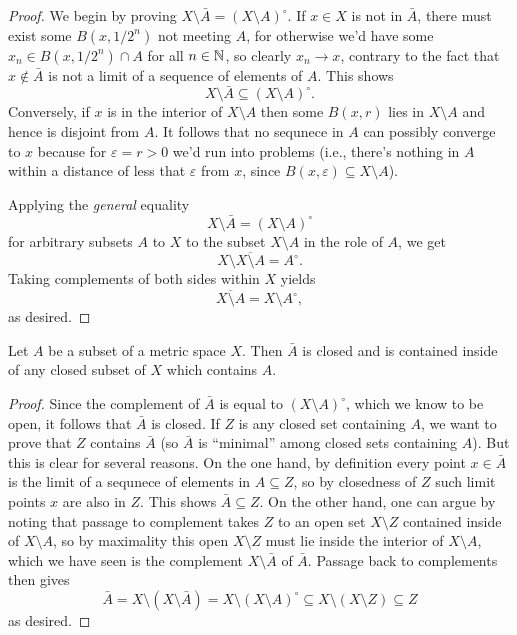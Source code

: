 \begin{proof}
  We begin by proving \(X\setminus\bar A=(X\setminus A)^\circ\). If \(x\in
  X\) is not in \(\bar A\), there must exist some \(B(x,1/2^n)\) not
  meeting \(A\), for otherwise we'd have some \(x_n\in B(x,1/2^n)\cap A\)
  for all \(n\in\mathbb{N}\), so clearly \(x_n\to x\), contrary to the fact that
  \(x\notin\bar A\) is not a limit of a sequence of elements of \(A\). This
  shows
  \[
    X\setminus\bar A\subseteq(X\setminus A)^\circ.
  \]
  Conversely, if \(x\) is in the interior of \(X\setminus A\) then some
  \(B(x,r)\) lies in \(X\setminus A\) and hence is disjoint from \(A\). It
  follows that no sequnece in \(A\) can possibly converge to \(x\) because
  for \(\varepsilon=r>0\) we'd run into problems (i.e., there's nothing in
  \(A\) within a distance of less that \(\varepsilon\) from \(x\), since
  \(B(x,\varepsilon)\subseteq X\setminus A\)).

  Applying the \emph{general} equality
  \[
    X\setminus\bar A=(X\setminus A)^\circ
  \]
  for arbitrary subsets \(A\) to \(X\) to the subset \(X\setminus A\) in
  the role of \(A\), we get
  \[
    X\setminus\overline{X\setminus A}=A^\circ.
  \]
  Taking complements of both sides within \(X\) yields
  \[
    \overline{X\setminus A}=X\setminus A^\circ,
  \]
  as desired.
\end{proof}
\begin{corollary}
  Let \(A\) be a subset of a metric space \(X\). Then \(\bar A\) is closed
  and is contained inside of any closed subset of \(X\) which contains
  \(A\).
\end{corollary}
\begin{proof}
  Since the complement of \(\bar A\) is equal to \((X\setminus A)^\circ\),
  which we know to be open, it follows that \(\bar A\) is closed. If \(Z\)
  is any closed set containing \(A\), we want to prove that \(Z\) contains
  \(\bar A\) (so \(\bar A\) is ``minimal'' among closed sets containing
  \(A\)). But this is clear for several reasons. On the one hand, by
  definition every point \(x\in\bar A\) is the limit of a sequnece of
  elements in \(A\subseteq Z\), so by closedness of \(Z\) such limit points
  \(x\) are also in \(Z\). This shows \(\bar A\subseteq Z\). On the other
  hand, one can argue by noting that passage to complement takes \(Z\) to
  an open set \(X\setminus Z\) contained inside of \(X\setminus A\), so by
  maximality this open \(X\setminus Z\) must lie inside the interior of
  \(X\setminus A\), which we have seen is the complement \(X\setminus\bar
  A\) of \(\bar A\). Passage back to complements then gives
  \[
    \bar A=X\setminus(X\setminus\bar A)=X\setminus(X\setminus
    A)^\circ\subseteq X\setminus(X\setminus Z)\subseteq Z
  \]
  as desired.
\end{proof}
